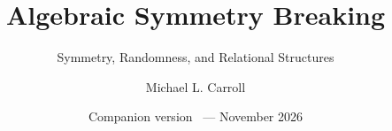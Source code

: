 \documentclass[aspectratio=169,11pt]{beamer}
\title[Algebraic Symmetry Breaking]{Algebraic Symmetry Breaking}
\subtitle{Symmetry, Randomness, and Relational Structures}
\author{Michael L. Carroll}
\institute{Key results of the monograph}
\date{Companion version \CompanionVersion\ --- November 2026}
\begin{document}
\begin{frame}[plain]
  \titlepage
\end{frame}










\appendix

\end{document}
